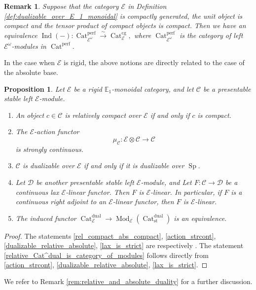 \documentclass[11pt,leqno]{amsart}
\newtheorem{prop}[theo]{Proposition}
\newtheorem{remark}[theo]{Remark}
\numberwithin{equation}{section}
\newcommand{\xto}{\xrightarrow}
\newcommand{\Cat}{\operatorname{Cat}}
\newcommand{\st}{\operatorname{st}}
\newcommand{\cg}{\operatorname{cg}}
\newcommand{\dual}{\operatorname{dual}}
\newcommand{\bE}{{\mathbb E}}
\newcommand{\cD}{{\mathcal D}}
\newcommand{\cC}{{\mathcal C}}
\newcommand{\cE}{{\mathcal E}}
\newcommand{\perf}{\operatorname{perf}}
\newcommand{\Sp}{\operatorname{Sp}}
\newcommand{\Ind}{\operatorname{Ind}}
\newcommand{\Mod}{\operatorname{Mod}}
\begin{document}
\begin{remark}\label{rem:Cat^perf_Cat^cg}
Suppose that the category $\cE$ in Definition \ref{def:dualizable_over_E_1_monoidal} is compactly generated, the unit object is compact and the tensor product of compact objects is compact. Then we have an equivalence $\Ind(-):\Cat_{\cE^{\omega}}^{\perf}\xto{\sim}\Cat_{\cE}^{\cg},$ where $\Cat_{\cE^{\omega}}^{\perf}$ is the category of left $\cE^{\omega}$-modules in $\Cat^{\perf}.$
\end{remark}

In the case when $\cE$ is rigid, the above notions are directly related to the case of the absolute base. 

\begin{prop}\label{prop:dualizable_over_E_same_as_modules}\cite{GaRo17}
Let $\cE$ be a rigid $\bE_1$-monoidal category, and let $\cC$ be a presentable stable left $\cE$-module. 
\begin{enumerate}[label=(\roman*), ref=(\roman*)]
\item An object $c\in\cC$ is relatively compact over $\cE$ if and only if $c$ is compact. \label{rel_compact_abs_compact}
\item The $\cE$-action functor 
$$\mu_{\cC}:\cE\otimes\cC\to\cC$$ is strongly continuous. \label{action_strcont}
\item $\cC$ is dualizable over $\cE$ if and only if it is dualizable over $\Sp.$ \label{dualizable_relative_absolute}
\item Let $\cD$ be another presentable stable left $\cE$-module, and Let $F:\cC\to\cD$ be a continuous lax $\cE$-linear functor. Then $F$ is $\cE$-linear. In particular, if $F$ is a continuous right adjoint to an $\cE$-linear functor, then $F$ is $\cE$-linear. \label{lax_is_strict}
\item The induced functor $\Cat_{\cE}^{\dual}\to\Mod_{\cE}(\Cat_{\st}^{\dual})$ is an equivalence. \label{relative_Cat^dual_is_category_of_modules}
\end{enumerate}
\end{prop}

\begin{proof}
The statements \ref{rel_compact_abs_compact}, \ref{action_strcont}, \ref{dualizable_relative_absolute}, \ref{lax_is_strict} are respectively \cite[Corollary 9.3.4, Lemma 9.3.2, Proposition 9.4.4, Lemma 9.3.6]{GaRo17}.
The statement \ref{relative_Cat^dual_is_category_of_modules} follows directly from \ref{action_strcont}, \ref{dualizable_relative_absolute}, \ref{lax_is_strict}.
\end{proof}
We refer to Remark \ref{rem:relative_and_absolute_duality} for a further discussion. 
\end{document}
